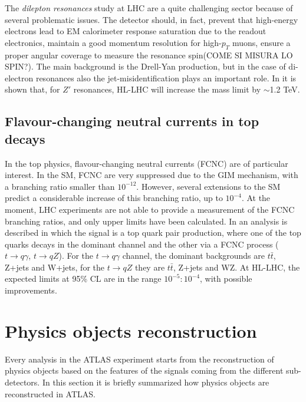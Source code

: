 \documentclass[a4paper,twoside,12pt]{article}
\begin{document}
The \textit{dilepton resonances} study at LHC are a quite challenging sector because of
several problematic issues. The detector should, in fact, prevent that high-energy electrons lead to EM calorimeter
response saturation due to the readout electronics, maintain a good momentum resolution for high-$p_T$ muons, ensure a proper angular coverage to measure the resonance spin(COME SI MISURA LO SPIN?). The main background is the Drell-Yan production, but in the 
case of di-electron resonances also the jet-misidentification plays an important role. In \cite{loi}
it is shown that, for $Z'$ resonances, HL-LHC will increase the mass limit by $\sim$1.2 TeV.

\subsection{Flavour-changing neutral currents in top decays}
In the top physics, flavour-changing neutral currents (FCNC) are of particular interest.
In the SM, FCNC are very suppressed due to the GIM mechanism, with a branching ratio smaller
than $10^{-12}$. However, several extensions to the SM predict a considerable increase of this branching ratio, up to $10^{-4}$. At the moment, LHC experiments are not able to provide a measurement of the FCNC branching ratios, and only upper limits have been calculated. 
In \cite{loi} an analysis is described in which the signal is a top quark pair production, where
one of the top quarks decays in the dominant channel and the other via a FCNC process 
($t \rightarrow q\gamma$, $t \rightarrow qZ$). For the $t \rightarrow q\gamma$ channel, 
the dominant backgrounds are $t\bar{t}$, Z+jets and W+jets, for the $t \rightarrow qZ$ they are $t\bar{t}$, Z+jets and WZ. At HL-LHC, the expected limits at 95\% CL are in the range
$10^{-5} : 10^{-4}$, with possible improvements. 

\newpage

\section{Physics objects reconstruction}
Every analysis in the ATLAS experiment starts from the reconstruction of physics objects
based on the features of the signals coming from the different sub-detectors\cite{PhysicsObjectReconstruction}. In this section it is briefly
summarized how physics objects are reconstructed in ATLAS.\\
\end{document}
